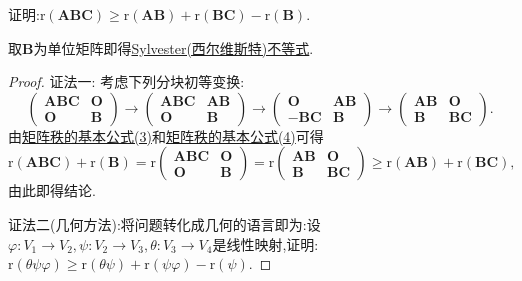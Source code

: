 \documentclass[../../main.tex]{subfiles}%
\begin{document}
\begin{proposition}\label{proposition:Frobenius(弗罗贝尼乌斯)不等式}证明:\(\mathrm{r}(\boldsymbol{A}\boldsymbol{B}\boldsymbol{C})\geqslant \mathrm{r}(\boldsymbol{A}\boldsymbol{B})+\mathrm{r}(\boldsymbol{B}\boldsymbol{C})-\mathrm{r}(\boldsymbol{B})\).
\end{proposition}
\begin{remark}
取$\boldsymbol{B}$为单位矩阵即得\hyperref[proposition:Sylvester(西尔维斯特)不等式]{Sylvester(西尔维斯特)不等式}.
\end{remark}
\begin{proof}

{\color{blue}证法一:}
考虑下列分块初等变换:
\[
\begin{pmatrix}
\boldsymbol{A}\boldsymbol{B}\boldsymbol{C}&\boldsymbol{O}\\
\boldsymbol{O}&\boldsymbol{B}
\end{pmatrix}\to
\begin{pmatrix}
\boldsymbol{A}\boldsymbol{B}\boldsymbol{C}&\boldsymbol{A}\boldsymbol{B}\\
\boldsymbol{O}&\boldsymbol{B}
\end{pmatrix}\to
\begin{pmatrix}
\boldsymbol{O}&\boldsymbol{A}\boldsymbol{B}\\
-\boldsymbol{B}\boldsymbol{C}&\boldsymbol{B}
\end{pmatrix}\to
\begin{pmatrix}
\boldsymbol{A}\boldsymbol{B}&\boldsymbol{O}\\
\boldsymbol{B}&\boldsymbol{B}\boldsymbol{C}
\end{pmatrix}.
\]
由\hyperref[矩阵秩的基本公式3]{矩阵秩的基本公式(3)}和\hyperref[矩阵秩的基本公式4]{矩阵秩的基本公式(4)}可得
\[
\mathrm{r}(\boldsymbol{A}\boldsymbol{B}\boldsymbol{C})+\mathrm{r}(\boldsymbol{B})=\mathrm{r}\begin{pmatrix}
\boldsymbol{A}\boldsymbol{B}\boldsymbol{C}&\boldsymbol{O}\\
\boldsymbol{O}&\boldsymbol{B}
\end{pmatrix}=\mathrm{r}\begin{pmatrix}
\boldsymbol{A}\boldsymbol{B}&\boldsymbol{O}\\
\boldsymbol{B}&\boldsymbol{B}\boldsymbol{C}
\end{pmatrix}\geqslant \mathrm{r}(\boldsymbol{A}\boldsymbol{B})+\mathrm{r}(\boldsymbol{B}\boldsymbol{C}),
\]
由此即得结论. 

{\color{blue}证法二(几何方法):}将问题转化成几何的语言即为:设\(\varphi:V_1\to V_2,\psi:V_2\to V_3,\theta:V_3\to V_4\)是线性映射,证明:\(\text{r}(\theta\psi\varphi)\geqslant \text{r}(\theta\psi)+\text{r}(\psi\varphi)-\text{r}(\psi)\).


\end{proof}
\end{document}

